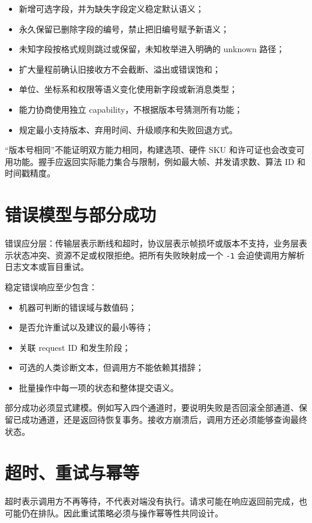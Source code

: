 \begin{itemize}
  \item 新增可选字段，并为缺失字段定义稳定默认语义；
  \item 永久保留已删除字段的编号，禁止把旧编号赋予新语义；
  \item 未知字段按格式规则跳过或保留，未知枚举进入明确的 unknown 路径；
  \item 扩大量程前确认旧接收方不会截断、溢出或错误饱和；
  \item 单位、坐标系和权限等语义变化使用新字段或新消息类型；
  \item 能力协商使用独立 capability，不根据版本号猜测所有功能；
  \item 规定最小支持版本、弃用时间、升级顺序和失败回退方式。
\end{itemize}

“版本号相同”不能证明双方能力相同，构建选项、硬件 SKU 和许可证也会改变可用功能。握手应返回实际能力集合与限制，例如最大帧、并发请求数、算法 ID 和时间戳精度。

\section{错误模型与部分成功}

错误应分层：传输层表示断线和超时，协议层表示帧损坏或版本不支持，业务层表示状态冲突、资源不足或权限拒绝。把所有失败映射成一个 \texttt{-1} 会迫使调用方解析日志文本或盲目重试。

稳定错误响应至少包含：

\begin{itemize}
  \item 机器可判断的错误域与数值码；
  \item 是否允许重试以及建议的最小等待；
  \item 关联 request ID 和发生阶段；
  \item 可选的人类诊断文本，但调用方不能依赖其措辞；
  \item 批量操作中每一项的状态和整体提交语义。
\end{itemize}

部分成功必须显式建模。例如写入四个通道时，要说明失败是否回滚全部通道、保留已成功通道，还是返回待恢复事务。接收方崩溃后，调用方还必须能够查询最终状态。

\section{超时、重试与幂等}

超时表示调用方不再等待，不代表对端没有执行。请求可能在响应返回前完成，也可能仍在排队。因此重试策略必须与操作幂等性共同设计。

